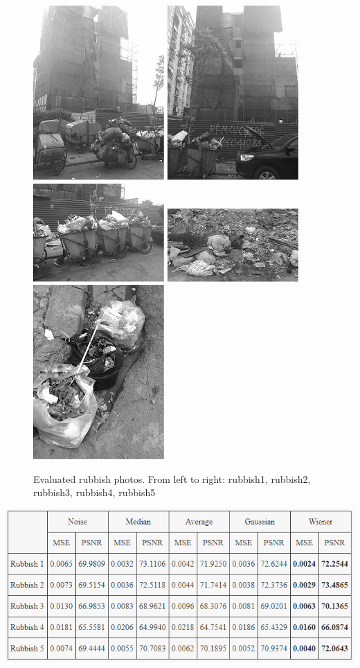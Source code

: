 \begin{figure}[h]
	\centering
	\includegraphics[width=0.18\columnwidth]{images/rubbish1.jpg}
	\includegraphics[width=0.18\columnwidth]{images/rubbish2.jpg}
	\includegraphics[width=0.18\columnwidth]{images/rubbish3.jpg}
	\includegraphics[width=0.18\columnwidth]{images/rubbish4.jpg}
	\includegraphics[width=0.18\columnwidth]{images/rubbish5.jpg}
	\caption{Evaluated rubbish photos. From left to right: rubbish1, rubbish2, rubbish3, rubbish4, rubbish5}
	\label{fig:rubbish}
\end{figure}

\begin{center}
\includegraphics[width=15cm]{images/Rubish.png}
\label{tab:rubbish}
\end{center}

